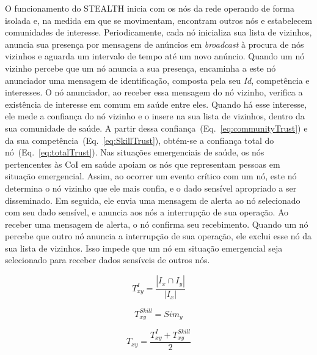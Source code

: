\documentclass[12pt]{article}
\begin{document}
O funcionamento do \mbox{STEALTH} inicia com os nós da rede operando de forma isolada e, na medida em que se movimentam, encontram outros nós e estabelecem comunidades de interesse. Periodicamente, cada nó inicializa sua lista de vizinhos, anuncia sua presença por mensagens de anúncios em \textit{broadcast} à procura de nós vizinhos e aguarda um intervalo de tempo até um novo anúncio.  Quando um nó vizinho percebe que um nó anuncia a sua presença, encaminha a este nó anunciador uma mensagem de identificação, composta pela seu \textit{Id}, competência e interesses. O nó anunciador, ao receber essa mensagem do nó vizinho, verifica a existência de interesse em comum em saúde entre eles. Quando há esse interesse,
ele mede a confiança do nó vizinho e o insere na sua lista de vizinhos, dentro da sua comunidade de saúde. A partir
dessa confiança~(Eq.~\ref{eq:communityTrust}) e da sua competência~(Eq.~\ref{eq:SkillTrust}), obtém-se a confiança total do nó~(Eq.~\ref{eq:totalTrust}). 
%
Nas situações emergenciais de saúde, os nós pertencentes às CoI 
em saúde apoiam os nós que representam pessoas em situação emergencial. Assim, ao ocorrer um evento crítico com um 
nó, este nó determina o nó vizinho 
que ele mais confia, e o dado sensível apropriado a ser disseminado. Em seguida, ele envia uma mensagem de alerta ao nó selecionado com seu dado sensível, e anuncia aos nós
a interrupção de sua operação. Ao receber uma mensagem de alerta, o nó confirma seu recebimento. Quando um nó percebe que outro nó anuncia a interrupção de sua operação, ele exclui esse nó da sua lista de vizinhos. Isso impede que um nó em situação emergencial seja selecionado para receber dados sensíveis de outros nós. 


\vspace{-0.5cm}

\noindent
\begin{minipage}{.3\linewidth}
\centering
\begin{equation}
T_{xy}^{I} = \frac {|I_x \cap I_y|}{|I_x|}
\label{eq:communityTrust}
\end{equation}
\end{minipage}
\begin{minipage}{.3\linewidth}
\centering
\begin{equation}
T_{xy}^{Skill} = Sim_y
\label{eq:SkillTrust}
\end{equation}
\end{minipage}
\hspace{0.5cm}
\begin{minipage}{.3\linewidth}
\centering
\begin{equation}
T_{xy} = \frac{T_{xy}^{I} + T_{xy}^{Skill}}{2}
\label{eq:totalTrust}
\end{equation}
\end{minipage}
\end{document}
